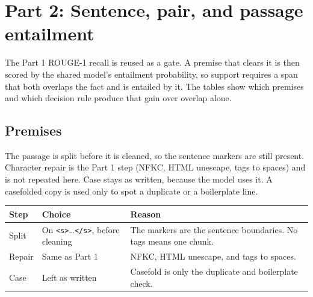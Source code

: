 ﻿\section{Part 2: Sentence, pair, and passage entailment}

The Part 1 ROUGE-1 recall is reused as a gate. A premise that clears it is then scored by the shared model's entailment probability, so support requires a span that both overlaps the fact and is entailed by it. The tables show which premises and which decision rule produce that gain over overlap alone.

\subsection{Premises}

The passage is split before it is cleaned, so the sentence markers are still present. Character repair is the Part 1 step (NFKC, HTML unescape, tags to spaces) and is not repeated here. Case stays as written, because the model uses it. A casefolded copy is used only to spot a duplicate or a boilerplate line.

\begin{center}
\small
\begin{tabular}{@{}llp{7.6cm}@{}}
\toprule
Step & Choice & Reason \\
\midrule
Split & On \texttt{<s>}\ldots\texttt{</s>}, before cleaning & The markers are the sentence boundaries. No tags means one chunk. \\
Repair & Same as Part 1 & NFKC, HTML unescape, and tags to spaces. \\
Case & Left as written & Casefold is only the duplicate and boilerplate check. \\
\bottomrule
\end{tabular}
\end{center}

